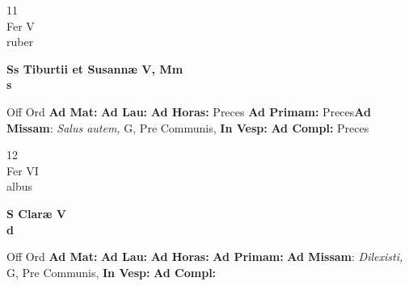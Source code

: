 \documentclass[10pt, openany]{book}
\begin{document}
    \begin{center}
        \begin{minipage}{3.5in}
            \vspace{2em}
            \begin{minipage}{0.5in}
                {\Huge 11} \\
                {\normalsize Fer V} \\
                {\normalsize ruber}
            \end{minipage}
            \begin{minipage}{3.0in}
                \textbf{ \large Ss Tiburtii et Susannæ V, Mm \\
                \textnormal{\normalsize s}} \\ 
            \end{minipage}
            \begin{justify}Off Ord
                \textbf{Ad Mat: }
                \textbf{Ad Lau: }
                \textbf{Ad Horas: }Preces
                \textbf{Ad Primam: }Preces\textbf{Ad Missam}: \textit{Salus autem,} G, Pre Communis,  
                \textbf{In Vesp: }
                \textbf{Ad Compl: }Preces
            \end{justify}
        \end{minipage}
    \end{center}

    \begin{center}
        \begin{minipage}{3.5in}
            \vspace{2em}
            \begin{minipage}{0.5in}
                {\Huge 12} \\
                {\normalsize Fer VI} \\
                {\normalsize albus}
            \end{minipage}
            \begin{minipage}{3.0in}
                \textbf{ \large S Claræ V \\
                \textnormal{\normalsize d}} \\ 
            \end{minipage}
            \begin{justify}Off Ord
                \textbf{Ad Mat: }
                \textbf{Ad Lau: }
                \textbf{Ad Horas: }
                \textbf{Ad Primam: }\textbf{Ad Missam}: \textit{Dilexisti,} G, Pre Communis,  
                \textbf{In Vesp: }
                \textbf{Ad Compl: }
            \end{justify}
        \end{minipage}
    \end{center}
\end{document}
